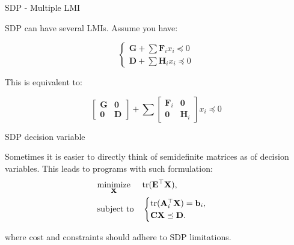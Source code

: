 \documentclass{beamer}
\begin{document}
\begin{frame}{SDP - Multiple LMI}
\begin{flushleft}

SDP can have several LMIs. Assume you have:

\begin{equation}
    \begin{cases}
        \mathbf{G} + \sum \mathbf{F}_i x_i \preceq 0 \\
        \mathbf{D} + \sum \mathbf{H}_i x_i \preceq 0
    \end{cases}
\end{equation}


This is equivalent to:

\begin{equation}
    \begin{bmatrix} 
            \mathbf{G} & \mathbf{0} \\
            \mathbf{0} & \mathbf{D}
    \end{bmatrix} +
    \sum
    \begin{bmatrix} 
            \mathbf{F}_i & \mathbf{0} \\
            \mathbf{0}   & \mathbf{H}_i
    \end{bmatrix}
    x_i \preceq 0
\end{equation}

\end{flushleft}
\end{frame}




\begin{frame}{SDP decision variable}
\begin{flushleft}

Sometimes it is easier to directly think of semidefinite matrices as of decision variables. This leads to programs with such formulation:
%
\begin{equation}
\begin{aligned}
& \underset{\mathbf{X}}{\text{minimize}}
& & \text{tr}(\mathbf{E}^\top \mathbf{X}), \\
& \text{subject to}
& & \begin{cases}
     \text{tr}(\mathbf{A}_i^\top\mathbf{X}) =  \mathbf{b}_i, \\
     \mathbf{C}\mathbf{X} \preceq \mathbf{D}.
    \end{cases}
\end{aligned}
\end{equation}

where cost and constraints should adhere to SDP limitations.

\end{flushleft}
\end{frame}
\end{document}
